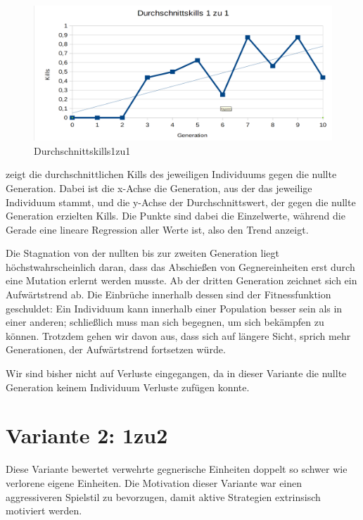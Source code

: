 \documentclass[
	12pt,
	a4paper,
	BCOR10mm,
	DIV14,
	headsepline,
	usegeometry,
]{scrreprt}
\begin{document}
\begin{figure}[h]
	\includegraphics[width = \textwidth]{Durchschnittskills1zu1.png}
	\caption{Durchschnittskills1zu1}
	\label{Durchschnittskills1zu1}
\end{figure}

 zeigt die durchschnittlichen Kills des jeweiligen Individuums gegen die nullte Generation.
Dabei ist die x-Achse die Generation, aus der das jeweilige Individuum stammt, und die y-Achse der Durchschnittswert, der gegen die nullte Generation erzielten Kills.
Die Punkte sind dabei die Einzelwerte, während die Gerade eine lineare Regression aller Werte ist, also den Trend anzeigt.

Die Stagnation von der nullten bis zur zweiten Generation liegt höchstwahrscheinlich daran, dass das Abschießen von Gegnereinheiten erst durch eine Mutation erlernt werden musste.
Ab der dritten Generation zeichnet sich ein Aufwärtstrend ab.
Die Einbrüche innerhalb dessen sind der Fitnessfunktion geschuldet: Ein Individuum kann innerhalb einer Population besser sein als in einer anderen; schließlich muss man sich begegnen, um sich bekämpfen zu können.
Trotzdem gehen wir davon aus, dass sich auf längere Sicht, sprich mehr Generationen, der Aufwärtstrend fortsetzen würde.

Wir sind bisher nicht auf Verluste eingegangen, da in dieser Variante die nullte Generation keinem Individuum Verluste zufügen konnte.

\section{Variante 2: 1zu2}
Diese Variante bewertet verwehrte gegnerische Einheiten doppelt so schwer wie verlorene eigene Einheiten.
Die Motivation dieser Variante war einen aggressiveren Spielstil zu bevorzugen, damit aktive Strategien extrinsisch motiviert werden.
\end{document}
